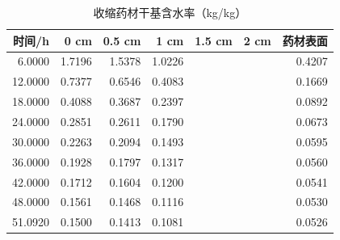 \begin{table}[htbp]
\centering
\caption{收缩药材干基含水率（kg/kg）}
\label{tab:q4_moisture}
\begin{tabular}{rrrrrrr}
\toprule
时间/h & 0 cm & 0.5 cm & 1 cm & 1.5 cm & 2 cm & 药材表面 \\
\midrule
6.0000 & 1.7196 & 1.5378 & 1.0226 &  &  & 0.4207 \\
12.0000 & 0.7377 & 0.6546 & 0.4083 &  &  & 0.1669 \\
18.0000 & 0.4088 & 0.3687 & 0.2397 &  &  & 0.0892 \\
24.0000 & 0.2851 & 0.2611 & 0.1790 &  &  & 0.0673 \\
30.0000 & 0.2263 & 0.2094 & 0.1493 &  &  & 0.0595 \\
36.0000 & 0.1928 & 0.1797 & 0.1317 &  &  & 0.0560 \\
42.0000 & 0.1712 & 0.1604 & 0.1200 &  &  & 0.0541 \\
48.0000 & 0.1561 & 0.1468 & 0.1116 &  &  & 0.0530 \\
51.0920 & 0.1500 & 0.1413 & 0.1081 &  &  & 0.0526 \\
\bottomrule
\end{tabular}
\end{table}
